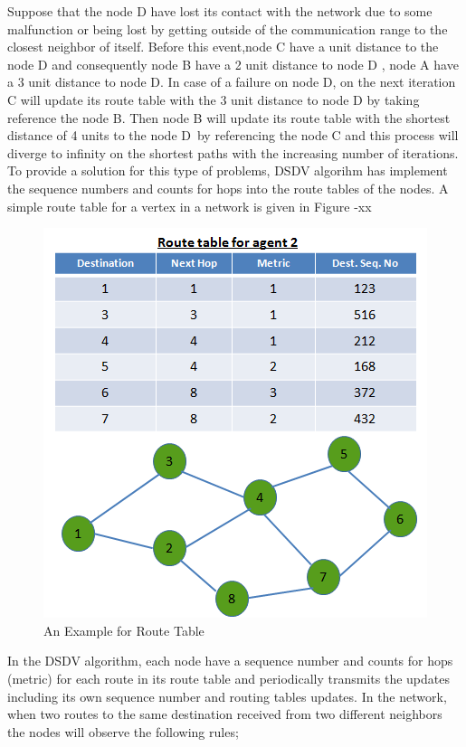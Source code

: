 \documentclass[twoside]{article}
\begin{document}
	

	
	Suppose that the node D have lost its contact with the network due to some malfunction or being lost by getting outside of the communication range to the closest neighbor of itself. Before this event,node C have a unit distance to the node D and consequently node B have a 2 unit distance to node D , node A have a 3 unit distance to node D. In case of a failure on node D, on the next iteration C will update its route table with the 3 unit distance to node D by taking reference the node B. Then node B will update its route table with the shortest distance of 4 units to the node D\ by referencing the node C and this process will diverge to infinity on the shortest paths with the increasing number of iterations. To provide a solution for this type of problems, DSDV algorihm has implement the sequence numbers and counts for hops into the route tables of the nodes. A simple route table for a vertex in a network is given in Figure -xx
		\begin{figure}[H]
			\caption{An Example for Route Table}
			\centering
			\includegraphics[scale = 0.65]{dest_seq}
		\end{figure}




	
	In the DSDV algorithm, each node have a sequence number and counts for hops (metric) for each route in its route table and periodically transmits the updates including its own sequence number and routing tables updates. In the network, when two routes to the same destination received from two different neighbors the nodes will observe the following rules;
	
\end{document}
